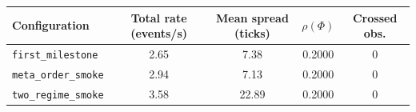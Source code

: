 \begin{tabular}{lcccc}
  \hline
  Configuration & Total rate (events/s) & Mean spread (ticks) & $\rho(\Phi)$ & Crossed obs. \\
  \hline
  \texttt{first\_milestone} & 2.65 & 7.38 & 0.2000 & 0 \\
  \texttt{meta\_order\_smoke} & 2.94 & 7.13 & 0.2000 & 0 \\
  \texttt{two\_regime\_smoke} & 3.58 & 22.89 & 0.2000 & 0 \\
  \hline
\end{tabular}
